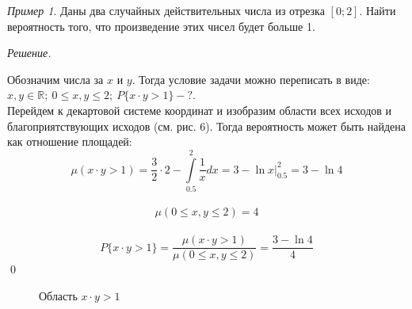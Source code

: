 \documentclass[12pt,a4paper]{article}
\theoremstyle{definition}
\theoremstyle{definition}
\theoremstyle{remark}
\theoremstyle{corollary}
\theoremstyle{bolditalic}
\newtheorem{example}{Пример}[section]
\newenvironment{solution}{
    \vspace{0.5em}
    \noindent\textit{Решение.}
}{\qed\vspace{1em}}
\begin{document}
\begin{example}
    Даны два случайных действительных числа из отрезка $[0;2]$. Найти вероятность того, что произведение этих чисел будет больше 1.
\end{example}

\begin{solution}
    Обозначим числа за $x$ и $y$. Тогда условие задачи можно переписать в виде: $x, y \in \mathbb{R};\ 0 \le x, y \le 2;\ P\{x\cdot y>1\} - ?$.\\
    Перейдем к декартовой системе координат и изобразим области всех исходов и благоприятствующих исходов (см. рис. 6). Тогда вероятность может быть найдена как отношение площадей:\\
    \[
    \mu(x\cdot y > 1) = \frac{3}{2}\cdot2 - \int\limits_{0.5}^{2}{\frac{1}{x}dx}=3-\ln{x}{\Big|}_{0.5}^{2}=3-\ln{4}
    \]\\
    \[
    \mu(0 \le x, y \le 2) = 4
    \]\\
    \[
    P\{x\cdot y>1\}=\frac{\mu(x\cdot y > 1)}{\mu(0 \le x, y \le 2)} = \frac{3-\ln{4}}{4}
    \]
\end{solution}

\begin{figure}[h]
\centering
{}
\caption{Область $x\cdot y > 1$}
\end{figure}

\newpage
\end{document}
